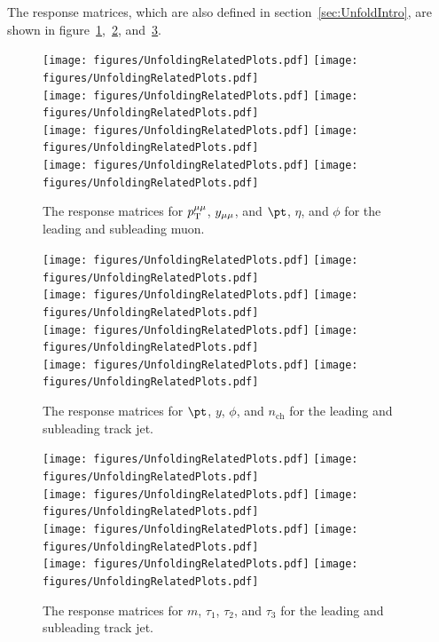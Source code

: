 The response matrices, which are also defined in section~\ref{sec:UnfoldIntro}, are shown in figure~\ref{fig:migMatDilep},~\ref{fig:migMatTJ1}, and~\ref{fig:migMatTJ2}.

\begin{figure}[h!]
  \centering
  \texttt{[image: figures/UnfoldingRelatedPlots.pdf]}
  \texttt{[image: figures/UnfoldingRelatedPlots.pdf]} \\
  \texttt{[image: figures/UnfoldingRelatedPlots.pdf]}
  \texttt{[image: figures/UnfoldingRelatedPlots.pdf]} \\
  \texttt{[image: figures/UnfoldingRelatedPlots.pdf]}
  \texttt{[image: figures/UnfoldingRelatedPlots.pdf]} \\
  \texttt{[image: figures/UnfoldingRelatedPlots.pdf]}
  \texttt{[image: figures/UnfoldingRelatedPlots.pdf]}
  \caption{The response matrices for $p_\mathrm{T}^{\mu\mu}$, $y_{\mu\mu}$, and $\pt$, $\eta$, and $\phi$ for the leading and subleading muon.}
  \label{fig:migMatDilep}
\end{figure}

\begin{figure}[h!]
  \centering
  \texttt{[image: figures/UnfoldingRelatedPlots.pdf]}
  \texttt{[image: figures/UnfoldingRelatedPlots.pdf]} \\
  \texttt{[image: figures/UnfoldingRelatedPlots.pdf]}
  \texttt{[image: figures/UnfoldingRelatedPlots.pdf]} \\
  \texttt{[image: figures/UnfoldingRelatedPlots.pdf]}
  \texttt{[image: figures/UnfoldingRelatedPlots.pdf]} \\
  \texttt{[image: figures/UnfoldingRelatedPlots.pdf]}
  \texttt{[image: figures/UnfoldingRelatedPlots.pdf]}
  \caption{The response matrices for $\pt$, $y$, $\phi$, and $n_{\text{ch}}$ for the leading and subleading track jet.}
  \label{fig:migMatTJ1}
\end{figure}

\begin{figure}[h!]
  \centering
  \texttt{[image: figures/UnfoldingRelatedPlots.pdf]}
  \texttt{[image: figures/UnfoldingRelatedPlots.pdf]} \\
  \texttt{[image: figures/UnfoldingRelatedPlots.pdf]}
  \texttt{[image: figures/UnfoldingRelatedPlots.pdf]} \\
  \texttt{[image: figures/UnfoldingRelatedPlots.pdf]}
  \texttt{[image: figures/UnfoldingRelatedPlots.pdf]} \\
  \texttt{[image: figures/UnfoldingRelatedPlots.pdf]}
  \texttt{[image: figures/UnfoldingRelatedPlots.pdf]}
  \caption{The response matrices for $m$, $\tau_1$, $\tau_2$, and $\tau_3$ for the leading and subleading track jet.}
  \label{fig:migMatTJ2}
\end{figure}

